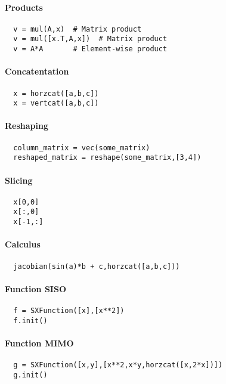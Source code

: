 \documentclass[a4paper,8pt,twocolumn]{article}
\begin{document}
\paragraph{Products}
\begin{verbatim}
  v = mul(A,x)  # Matrix product
  v = mul([x.T,A,x])  # Matrix product
  v = A*A       # Element-wise product
\end{verbatim}

\paragraph{Concatentation}
\begin{verbatim}
  x = horzcat([a,b,c])
  x = vertcat([a,b,c])
\end{verbatim}

\paragraph{Reshaping}
\begin{verbatim}
  column_matrix = vec(some_matrix)
  reshaped_matrix = reshape(some_matrix,[3,4])
\end{verbatim}

\paragraph{Slicing}
\begin{verbatim}
  x[0,0]
  x[:,0]
  x[-1,:]
\end{verbatim}

\paragraph{Calculus}
\begin{verbatim}
  jacobian(sin(a)*b + c,horzcat([a,b,c]))
\end{verbatim}

\paragraph{Function SISO}

\begin{verbatim}
  f = SXFunction([x],[x**2])
  f.init()
\end{verbatim}

\paragraph{Function MIMO}
\begin{verbatim}
  g = SXFunction([x,y],[x**2,x*y,horzcat([x,2*x])])
  g.init()
\end{verbatim}
\end{document}
